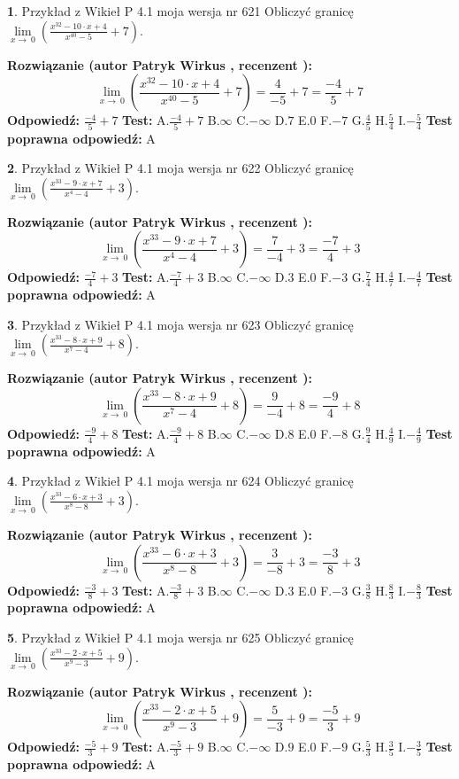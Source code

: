 \documentclass[12pt, a4paper]{article}
\theoremstyle{definition} %
\newtheorem{zad}{}
\newcommand{\zadStart}[1]{\begin{zad}#1\newline}
\newcommand{\zadStop}{\end{zad}}
\newcommand{\rozwStart}[2]{\noindent \textbf{Rozwiązanie (autor #1 , recenzent #2): }\newline}
\newcommand{\rozwStop}{\newline}
\newcommand{\odpStart}{\noindent \textbf{Odpowiedź:}\newline}
\newcommand{\odpStop}{\newline}
\newcommand{\testStart}{\noindent \textbf{Test:}\newline}
\newcommand{\testStop}{\newline}
\newcommand{\kluczStart}{\noindent \textbf{Test poprawna odpowiedź:}\newline}
\newcommand{\kluczStop}{\newline}
\begin{document}
\zadStart{Przykład z Wikieł P 4.1 moja wersja nr 621}
Obliczyć granicę $\lim\limits_{x\to\ 0}(\frac{x^{32}-10 \cdot x +4}{x^{40}-5}+7)$.
\zadStop
\rozwStart{Patryk Wirkus}{}
$$\lim\limits_{x\to\ 0}(\frac{x^{32}-10 \cdot x +4}{x^{40}-5}+7)=\frac{4}{-5}+7=\frac{-4}{5}+7$$
\rozwStop
\odpStart
$\frac{-4}{5}+7$
\odpStop
\testStart
A.$\frac{-4}{5}+7$
B.$\infty$
C.$-\infty$
D.$7$
E.$0$
F.$-7$
G.$\frac{4}{5}$
H.$\frac{5}{4}$
I.$-\frac{5}{4}$
\testStop
\kluczStart
A
\kluczStop



\zadStart{Przykład z Wikieł P 4.1 moja wersja nr 622}
Obliczyć granicę $\lim\limits_{x\to\ 0}(\frac{x^{33}-9 \cdot x +7}{x^{4}-4}+3)$.
\zadStop
\rozwStart{Patryk Wirkus}{}
$$\lim\limits_{x\to\ 0}(\frac{x^{33}-9 \cdot x +7}{x^{4}-4}+3)=\frac{7}{-4}+3=\frac{-7}{4}+3$$
\rozwStop
\odpStart
$\frac{-7}{4}+3$
\odpStop
\testStart
A.$\frac{-7}{4}+3$
B.$\infty$
C.$-\infty$
D.$3$
E.$0$
F.$-3$
G.$\frac{7}{4}$
H.$\frac{4}{7}$
I.$-\frac{4}{7}$
\testStop
\kluczStart
A
\kluczStop



\zadStart{Przykład z Wikieł P 4.1 moja wersja nr 623}
Obliczyć granicę $\lim\limits_{x\to\ 0}(\frac{x^{33}-8 \cdot x +9}{x^{7}-4}+8)$.
\zadStop
\rozwStart{Patryk Wirkus}{}
$$\lim\limits_{x\to\ 0}(\frac{x^{33}-8 \cdot x +9}{x^{7}-4}+8)=\frac{9}{-4}+8=\frac{-9}{4}+8$$
\rozwStop
\odpStart
$\frac{-9}{4}+8$
\odpStop
\testStart
A.$\frac{-9}{4}+8$
B.$\infty$
C.$-\infty$
D.$8$
E.$0$
F.$-8$
G.$\frac{9}{4}$
H.$\frac{4}{9}$
I.$-\frac{4}{9}$
\testStop
\kluczStart
A
\kluczStop



\zadStart{Przykład z Wikieł P 4.1 moja wersja nr 624}
Obliczyć granicę $\lim\limits_{x\to\ 0}(\frac{x^{33}-6 \cdot x +3}{x^{8}-8}+3)$.
\zadStop
\rozwStart{Patryk Wirkus}{}
$$\lim\limits_{x\to\ 0}(\frac{x^{33}-6 \cdot x +3}{x^{8}-8}+3)=\frac{3}{-8}+3=\frac{-3}{8}+3$$
\rozwStop
\odpStart
$\frac{-3}{8}+3$
\odpStop
\testStart
A.$\frac{-3}{8}+3$
B.$\infty$
C.$-\infty$
D.$3$
E.$0$
F.$-3$
G.$\frac{3}{8}$
H.$\frac{8}{3}$
I.$-\frac{8}{3}$
\testStop
\kluczStart
A
\kluczStop



\zadStart{Przykład z Wikieł P 4.1 moja wersja nr 625}
Obliczyć granicę $\lim\limits_{x\to\ 0}(\frac{x^{33}-2 \cdot x +5}{x^{9}-3}+9)$.
\zadStop
\rozwStart{Patryk Wirkus}{}
$$\lim\limits_{x\to\ 0}(\frac{x^{33}-2 \cdot x +5}{x^{9}-3}+9)=\frac{5}{-3}+9=\frac{-5}{3}+9$$
\rozwStop
\odpStart
$\frac{-5}{3}+9$
\odpStop
\testStart
A.$\frac{-5}{3}+9$
B.$\infty$
C.$-\infty$
D.$9$
E.$0$
F.$-9$
G.$\frac{5}{3}$
H.$\frac{3}{5}$
I.$-\frac{3}{5}$
\testStop
\kluczStart
A
\kluczStop
\end{document}
